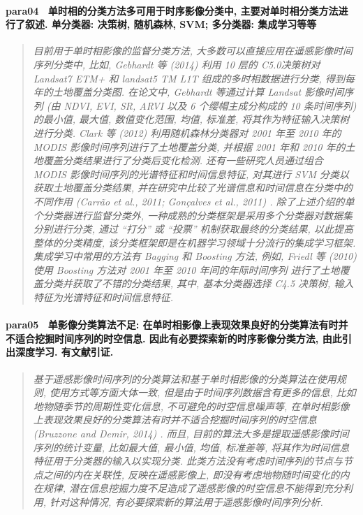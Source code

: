 \paragraph*{para04~
    \textcolor[RGB]{17, 205, 29}{单时相的分类方法多可用于时序影像分类中, 主要对单时相分类方法进行了叙述. 单分类器: 决策树, 随机森林, SVM; 多分类器: 集成学习等等}}
\begin{quotation}
    \itshape
    目前用于单时相影像的监督分类方法, 大多数可以直接应用在遥感影像时间序列分类中, 比如, Gebhardt 等 (2014) 利用 10 层的 C5.0决策树对 Landsat7 ETM+  和 landsat5 TM L1T 组成的多时相数据进行分类, 得到每年的土地覆盖分类图. 在论文中, Gebhardt 等通过计算 Landsat 影像时间序列 (由 NDVI, EVI, SR, ARVI 以及 6 个缨帽主成分构成的 10 条时间序列) 的最小值, 最大值, 数值变化范围, 均值, 标准差, 将其作为特征输入决策树进行分类. Clark 等 (2012) 利用随机森林分类器对 2001 年至 2010 年的 MODIS 影像时间序列进行了土地覆盖分类, 并根据 2001 年和 2010 年的土地覆盖分类结果进行了分类后变化检测. 还有一些研究人员通过组合 MODIS 影像时间序列的光谱特征和时间信息特征, 对其进行 SVM 分类以获取土地覆盖分类结果, 并在研究中比较了光谱信息和时间信息在分类中的不同作用 (Carrão et al., 2011; Gonçalves et  al., 2011) . 除了上述介绍的单个分类器进行监督分类外, 一种成熟的分类框架是采用多个分类器对数据集分别进行分类, 通过 ``打分'' 或 ``投票'' 机制获取最终的分类结果, 以此提高整体的分类精度, 该分类框架即是在机器学习领域十分流行的集成学习框架. 集成学习中常用的方法有 Bagging 和 Boosting 方法, 例如, Friedl 等 (2010) 使用 Boosting 方法对 2001 年至 2010 年间的年际时间序列    进行了土地覆盖分类并获取了不错的分类结果, 其中, 基本分类器选择 C4.5 决策树, 输入特征为光谱特征和时间信息特征. 
\end{quotation}

\paragraph*{para05~
    \textcolor[RGB]{17, 205, 29}{单影像分类算法不足: 在单时相影像上表现效果良好的分类算法有时并不适合挖掘时间序列的时空信息. 因此有必要探索新的时序影像分类方法, 由此引出深度学习. 有文献引证.}}
\begin{quotation}
    \itshape
    基于遥感影像时间序列的分类算法和基于单时相影像的分类算法在使用规则, 使用方式等方面大体一致, 但是由于时间序列数据含有更多的信息, 比如地物随季节的周期性变化信息, 不可避免的时空信息噪声等, 在单时相影像上表现效果良好的分类算法有时并不适合挖掘时间序列的时空信息 (Bruzzone  and Demir, 2014) . 而且, 目前的算法大多是提取遥感影像时间序列的统计变量, 比如最大值, 最小值, 均值, 标准差等, 将其作为时间信息特征用于分类器的输入以实现分类. 此类方法没有考虑时间序列的节点与节点之间的内在关联性, 反映在遥感影像上, 即没有考虑地物随时间变化的内在规律, 潜在信息挖掘力度不足造成了遥感影像的时空信息不能得到充分利用, 针对这种情况, 有必要探索新的算法用于遥感影像时间序列分析. 
\end{quotation}

